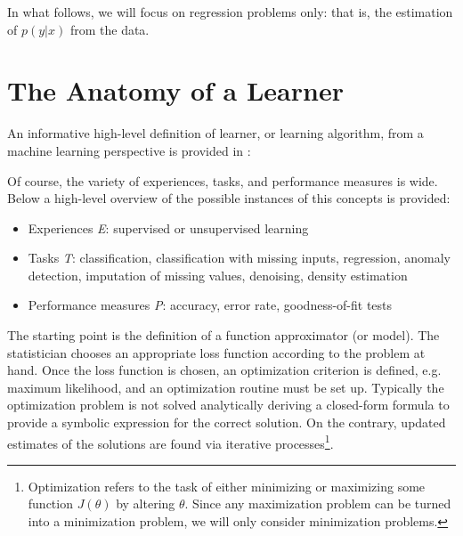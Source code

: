 In what follows, we will focus on regression problems only: that is, the estimation of $p(y|x)$ from the data.





\section{The Anatomy of a Learner}
An informative high-level definition of learner, or learning algorithm, from a machine learning perspective is provided in \cite{Mitchell1997}:
\begin{displayquote}
\end{displayquote}
Of course, the variety of experiences, tasks, and performance measures is wide. Below a high-level overview of the possible instances of this concepts is provided:
\begin{itemize}
    \item Experiences \textit{E}: supervised or unsupervised learning
    \item Tasks \textit{T}: classification, classification with missing inputs, regression, anomaly detection, imputation of missing values, denoising, density estimation
    \item Performance measures \textit{P}: accuracy, error rate, goodness-of-fit tests
\end{itemize}
The starting point is the definition of a function approximator (or model). The statistician chooses an appropriate loss function according to the problem at hand. Once the loss function is chosen, an optimization criterion is defined, e.g. maximum likelihood, and an optimization routine must be set up. Typically the optimization problem is not solved analytically deriving a closed-form formula to provide a symbolic expression for the correct solution. On the contrary, updated estimates of the solutions are found via iterative processes\footnote{Optimization refers to the task of either minimizing or maximizing some function $J(\theta)$ by altering $\theta$. Since any maximization problem can be turned into a minimization problem, we will only consider minimization problems.}.

